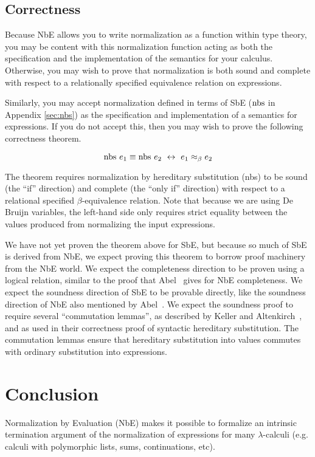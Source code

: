 \documentclass[runningheads,a4paper]{llncs}
\newcommand{\refapp}[1]{Appendix \ref{sec:#1}}
\def\nbs{\fun{nbs}}
\newcommand{\fun}[1]{\textmd{#1}}
\begin{document}
\subsection{Correctness}

Because NbE allows you to write normalization as a function within
type theory, you may be content with this normalization
function acting as both the specification and the implementation of
the semantics for your calculus. Otherwise, you may wish to prove that
normalization is both sound and complete with respect to a
relationally specified equivalence relation on expressions.

Similarly, you may accept normalization defined in terms of SbE
($\nbs$ in \refapp{nbs}) as the specification and implementation of a semantics
for expressions. If you do not accept this, then you may wish to prove
the following correctness theorem.

$$
\nbs~e_1 \equiv \nbs~e_2 ~\leftrightarrow~ e_1 \approx_\beta e_2
$$

The theorem requires normalization by hereditary substitution (\nbs)
to be sound (the ``if'' direction) and complete
(the ``only if'' direction) with respect to a relational specified
$\beta$-equivalence relation. Note that because we are using De Bruijn
variables, the left-hand side only requires strict equality between
the values produced from normalizing the input expressions. 

We have not yet proven the theorem above for SbE, but because so much
of SbE is derived from NbE, we expect proving this theorem to
borrow proof machinery from the NbE world. We expect the completeness
direction to be proven using a logical relation, similar to the proof
that Abel~\cite{abelhabil} gives for NbE completeness.
We expect the soundness direction of SbE to be provable directly, like
the soundness direction of NbE also mentioned by Abel~\cite{abelhabil}.
We expect the soundness proof to require several
``commutation lemmas'', as described by Keller and
Altenkirch~\cite{keller}, and as used in their correctness proof of syntactic hereditary substitution. 
The commutation lemmas ensure that
hereditary substitution into values commutes with ordinary substitution
into expressions.

\section{Conclusion}
\label{sec:conclusion}

Normalization by Evaluation (NbE) makes it possible to formalize an
intrinsic termination argument of the normalization of expressions for
many $\lambda$-calculi (e.g. calculi with polymorphic lists, sums,
continuations, etc). 
\end{document}
